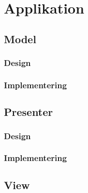 \chapter{Applikation}


\section{Model}

\subsection{Design}

\subsection{Implementering}


\section{Presenter}

\subsection{Design}

\subsection{Implementering}


\section{View}









